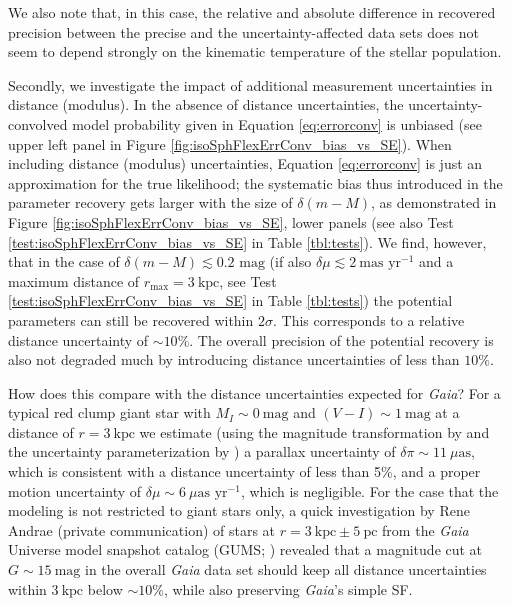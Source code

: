 \documentclass[iop,revtex4,numberedappendix,appendixfloats]{emulateapj}
\begin{document}
We also note that, in this case, the relative and absolute difference in recovered precision between the precise and the uncertainty-affected data sets does not seem to depend strongly on the kinematic temperature of the stellar population.

Secondly, we investigate the impact of additional measurement uncertainties in distance (modulus). In the absence of distance uncertainties, the uncertainty-convolved model probability given in Equation \eqref{eq:errorconv} is unbiased (see upper left panel in Figure \ref{fig:isoSphFlexErrConv_bias_vs_SE}). When including distance (modulus) uncertainties, Equation \eqref{eq:errorconv} is just an approximation for the true likelihood; the systematic bias thus introduced in the parameter recovery gets larger with the size of $\delta (m-M)$, as demonstrated in Figure \ref{fig:isoSphFlexErrConv_bias_vs_SE}, lower panels (see also Test \ref{test:isoSphFlexErrConv_bias_vs_SE} in Table \ref{tbl:tests}). We find, however, that in the case of $\delta(m-M) \lesssim 0.2 \text{ mag}$ (if also $\delta \mu \lesssim 2 ~\text{mas yr}^{-1}$ and a maximum distance of $r_\text{max} = 3~\text{kpc}$, see Test \ref{test:isoSphFlexErrConv_bias_vs_SE} in Table \ref{tbl:tests}) the potential parameters can still be recovered within $2 \sigma$. This corresponds to a relative distance uncertainty of $\sim10\%$. The overall precision of the potential recovery is also not degraded much by introducing distance uncertainties of less than $10\%$.

How does this compare with the distance uncertainties expected for \emph{Gaia}? For a typical red clump giant star with $M_I\sim0~\text{mag}$ and $(V-I)\sim1~\text{mag}$ at a distance of $r=3~\text{kpc}$ we estimate (using the magnitude transformation by \citet{2010A&A...523A..48J} and the uncertainty parameterization by \citet{2014EAS....67...23D}) a parallax uncertainty of $\delta\pi\sim11~\mu\text{as}$, which is consistent with a distance uncertainty of less than 5\%, and a proper motion uncertainty of $\delta \mu\sim6~\mu\text{as yr}^{-1}$, which is negligible. For the case that the modeling is not restricted to giant stars only, a quick investigation by Rene Andrae (private communication) of stars at $r=3~\text{kpc}\pm5~\text{pc}$ from the \emph{Gaia} Universe model snapshot catalog (GUMS; \citealt{2012A&A...543A.100R}) revealed that a magnitude cut at $G\sim15~\text{mag}$ in the overall \emph{Gaia} data set should keep all distance uncertainties within $3~\text{kpc}$ below $\sim10\%$, while also preserving \emph{Gaia}'s simple SF.
\end{document}
